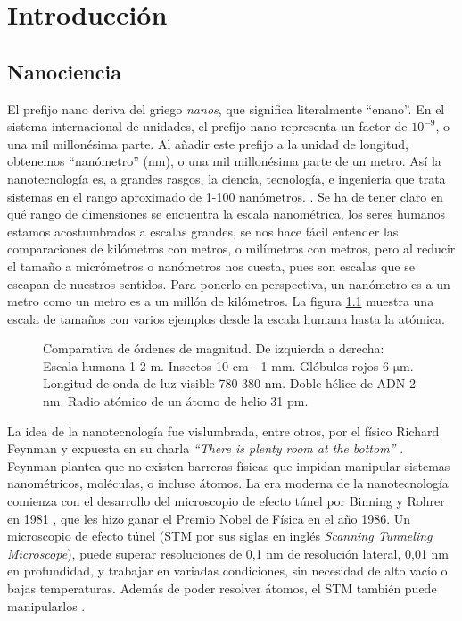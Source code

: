 \chapter{Introducción}
\section{Nanociencia}
El prefijo nano deriva del griego \emph{nanos}, que significa literalmente ``enano''. En el sistema internacional de unidades, el prefijo nano representa un factor de $\mathrm{10^{-9}}$, o una mil millonésima parte. Al añadir este prefijo a la unidad de longitud, obtenemos ``nanómetro'' (nm), o una mil millonésima parte de un metro. Así la nanotecnología es, a grandes rasgos, la ciencia, tecnología, e ingeniería que trata sistemas en el rango aproximado de 1-100 nanómetros. \citep{Haick2013,Gressler2013}. Se ha de tener claro en qué rango de dimensiones se encuentra la escala nanométrica, los seres humanos estamos acostumbrados a escalas grandes, se nos hace fácil entender las comparaciones de kilómetros con metros, o milímetros con metros, pero al reducir el tamaño a micrómetros o nanómetros nos cuesta, pues son escalas que se escapan de nuestros sentidos. Para ponerlo en perspectiva, un nanómetro es a un metro como un metro es a un millón de kilómetros. La figura \ref{fig:scale} muestra una escala de tamaños con varios ejemplos desde la escala humana hasta la atómica.

\begin{figure}[h!]
	\centering
	\caption[Comparativa de ódenes de magnitud desde metros hasta picometros]{Comparativa de órdenes de magnitud. De izquierda a derecha: Escala humana 1-2 m. Insectos 10 cm - 1 mm. Glóbulos rojos 6 $\mathrm{\mu}$m. Longitud de onda de luz visible 780-380 nm. Doble hélice de ADN 2 nm. Radio atómico de un átomo de helio 31 pm.}
\label{fig:scale}
\end{figure}

La idea de la nanotecnología fue vislumbrada, entre otros, por el físico Richard Feynman y expuesta en su charla \emph{``There is plenty room at the bottom''} \citep{Feynman1960}. Feynman plantea que no existen barreras físicas que impidan manipular sistemas nanométricos, moléculas, o incluso átomos. La era moderna de la nanotecnología comienza con el desarrollo del microscopio de efecto túnel por Binning y Rohrer en 1981 \citep{Binnig1982}, que les hizo ganar el Premio Nobel de Física en el año 1986. Un microscopio de efecto túnel (STM por sus siglas en inglés \emph{Scanning Tunneling Microscope}), puede superar resoluciones de 0,1 nm de resolución lateral, 0,01 nm en profundidad, y trabajar en variadas condiciones, sin necesidad de alto vacío o bajas temperaturas. Además de poder resolver átomos, el STM también puede manipularlos \citep{Chen2008}.

